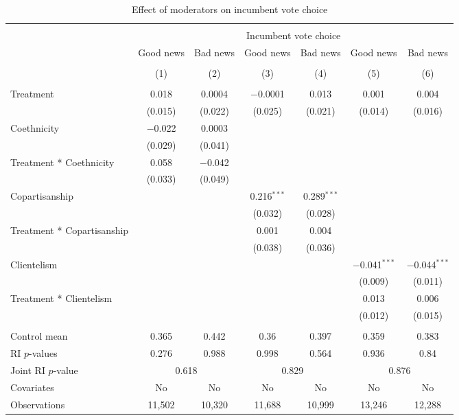 \documentclass[]{article}
\begin{document}
\begin{table}[!htbp] \centering 
  \caption{Effect of moderators on incumbent vote choice} 
  \label{moderators} 
\begin{tabular}{@{\extracolsep{1pt}}lcccccc} 
\\[-1.8ex]\hline 
\hline \\[-1.8ex] 
 & \multicolumn{6}{c}{Incumbent vote choice} \\ 
\cline{2-7} 
 & Good news & Bad news & Good news & Bad news & Good news & Bad news \\ 
\cline{2-7}
\\[-1.8ex] & (1) & (2) & (3) & (4) & (5) & (6)\\ 
\hline \\[-1.8ex] 
 Treatment & 0.018 & 0.0004 & $-$0.0001 & 0.013 & 0.001 & 0.004 \\ 
  & (0.015) & (0.022) & (0.025) & (0.021) & (0.014) & (0.016) \\ 
  Coethnicity & $-$0.022 & 0.0003 &  &  &  &  \\ 
  & (0.029) & (0.041) &  &  &  &  \\ 
  Treatment * Coethnicity & 0.058 & $-$0.042 &  &  &  &  \\ 
  & (0.033) & (0.049) &  &  &  &  \\ 
  Copartisanship &  &  & 0.216$^{***}$ & 0.289$^{***}$ &  &  \\ 
  &  &  & (0.032) & (0.028) &  &  \\ 
  Treatment * Copartisanship &  &  & 0.001 & 0.004 &  &  \\ 
  &  &  & (0.038) & (0.036) &  &  \\ 
  Clientelism &  &  &  &  & $-$0.041$^{***}$ & $-$0.044$^{***}$ \\ 
  &  &  &  &  & (0.009) & (0.011) \\ 
  Treatment * Clientelism &  &  &  &  & 0.013 & 0.006 \\ 
  &  &  &  &  & (0.012) & (0.015) \\ 
 \hline \\[-1.8ex] 
Control mean & 0.365 & 0.442 & 0.36 & 0.397 & 0.359 & 0.383 \\ 
RI $p$-values & 0.276 & 0.988 & 0.998 & 0.564 & 0.936 & 0.84 \\ 
Joint RI $p$-value & \multicolumn{2}{c}{0.618} & \multicolumn{2}{c}{0.829} & \multicolumn{2}{c}{0.876} \\
Covariates & No & No & No & No & No & No \\ 
Observations & 11,502 & 10,320 & 11,688 & 10,999 & 13,246 & 12,288 \\ 

\end{tabular}
\end{table}
\end{document}
